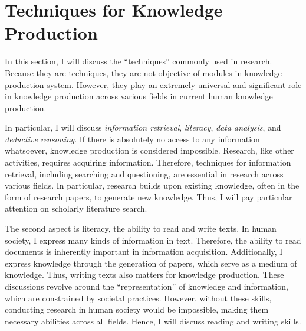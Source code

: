 \documentclass{article}
\begin{document}



\section{Techniques for Knowledge Production}

In this section, I will discuss the ``techniques'' commonly used in research. Because they are techniques, they are not objective of modules in knowledge production system. However, they play an extremely universal and significant role in knowledge production across various fields in current human knowledge production. 

In particular, I will discuss \textit{information retrieval}, \textit{literacy}, \textit{data analysis}, and \textit{deductive reasoning}. If there is absolutely no access to any information whatsoever, knowledge production is considered impossible. Research, like other activities, requires acquiring information. Therefore, techniques for information retrieval, including searching and questioning, are essential in research across various fields. In particular, research builds upon existing knowledge, often in the form of research papers, to generate new knowledge. Thus, I will pay particular attention on scholarly literature search. 

The second aspect is literacy, the ability to read and write texts. In human society, I express many kinds of information in text. Therefore, the ability to read documents is inherently important in information acquisition. Additionally, I express knowledge through the generation of papers, which serve as a medium of knowledge. Thus, writing texts also matters for knowledge production. These discussions revolve around the ``representation'' of knowledge and information, which are constrained by societal practices. However, without these skills, conducting research in human society would be impossible, making them necessary abilities across all fields. Hence, I will discuss reading and writing skills. 
\end{document}
